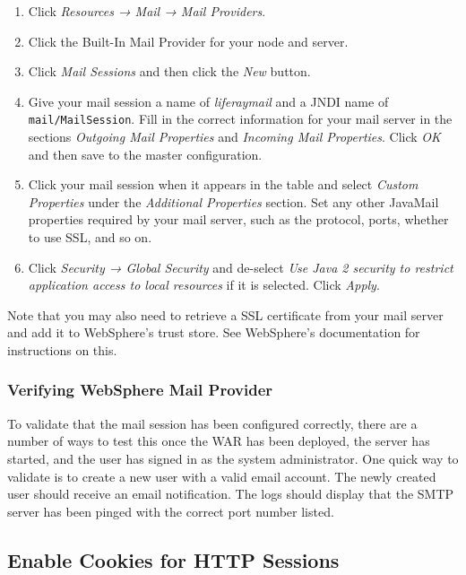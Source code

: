 \begin{enumerate}
\def\labelenumi{\arabic{enumi}.}
\item
  Click \emph{Resources → Mail → Mail Providers}.
\item
  Click the Built-In Mail Provider for your node and server.
\item
  Click \emph{Mail Sessions} and then click the \emph{New} button.
\item
  Give your mail session a name of \emph{liferaymail} and a JNDI name of
  \texttt{mail/MailSession}. Fill in the correct information for your
  mail server in the sections \emph{Outgoing Mail Properties} and
  \emph{Incoming Mail Properties}. Click \emph{OK} and then save to the
  master configuration.
\item
  Click your mail session when it appears in the table and select
  \emph{Custom Properties} under the \emph{Additional Properties}
  section. Set any other JavaMail properties required by your mail
  server, such as the protocol, ports, whether to use SSL, and so on.
\item
  Click \emph{Security → Global Security} and de-select \emph{Use Java 2
  security to restrict application access to local resources} if it is
  selected. Click \emph{Apply}.
\end{enumerate}

Note that you may also need to retrieve a SSL certificate from your mail
server and add it to WebSphere's trust store. See WebSphere's
documentation for instructions on this.

\subsubsection{Verifying WebSphere Mail
Provider}\label{verifying-websphere-mail-provider}

To validate that the mail session has been configured correctly, there
are a number of ways to test this once the WAR has been deployed, the
server has started, and the user has signed in as the system
administrator. One quick way to validate is to create a new user with a
valid email account. The newly created user should receive an email
notification. The logs should display that the SMTP server has been
pinged with the correct port number listed.

\subsection{Enable Cookies for HTTP
Sessions}\label{enable-cookies-for-http-sessions}


